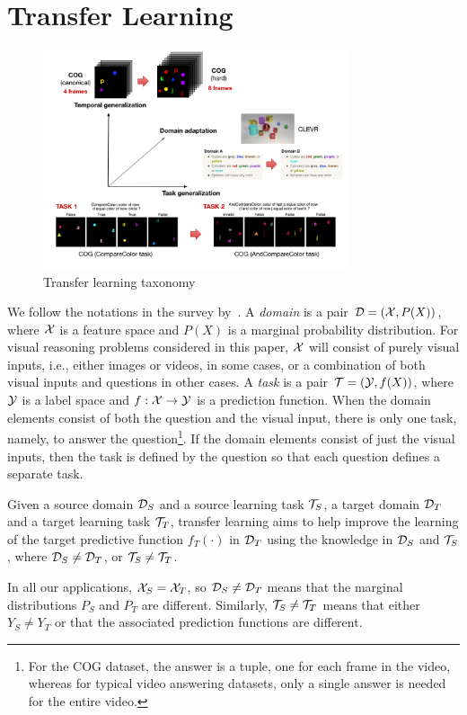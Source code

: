 \section{Transfer Learning}

\begin{figure}
	\caption{Transfer learning taxonomy}
	\label{fig:taskonomy}
	\includegraphics[width=0.8\textwidth]{img/architecture/transfer_taxo}
\end{figure}

We follow the notations in the survey by~\cite{pan-yang}.
A \emph{domain} is a pair $\mathcal{D} = (\mathcal{X},P(X))$, where $\mathcal{X}$ is a feature space and $P(X)$ is a marginal probability distribution.
For visual reasoning problems considered in this paper, 
$\mathcal{X}$ will consist of purely visual inputs, i.e., either images or videos, in some cases, or 
a combination of both visual inputs and questions in other cases. 
A \emph{task} is a pair $\mathcal{T}= (\mathcal{Y},f(X))$, where $\mathcal{Y}$ is a label space and $f: \mathcal{X} \to \mathcal{Y}$ is a prediction function. 
When the domain elements consist of both the question and the visual input, there is only one task, namely, to answer the 
question\footnote{%
	For the COG dataset, the answer is a tuple, one for each frame in the video, whereas for typical video answering datasets,
	only a single answer is needed for the entire video.}. %
If the domain elements consist of just the visual inputs, then the task is defined by the question so that each question 
defines a separate task.
\begin{definition}
	Given a source domain $\mathcal{D}_S$ and a source learning task $\mathcal{T}_S$, a target domain $\mathcal{D}_T$ and a target learning task $\mathcal{T}_T$, transfer learning aims to help improve the 
	learning of the target predictive function $f_T(\cdot)$ in $\mathcal{D}_T$ using the knowledge  in $\mathcal{D}_S$ and $\mathcal{T}_S$, where $\mathcal{D}_S \ne \mathcal{D}_T$, or $\mathcal{T}_S \ne \mathcal{T}_T$.
\end{definition}
In all our applications, $\mathcal{X}_S = \mathcal{X}_T$, so $\mathcal{D}_S \ne \mathcal{D}_T$ means that the marginal distributions $P_S$ and $P_T$ are different.
Similarly, $\mathcal{T}_S \ne \mathcal{T}_T$ means that either $Y_S \ne Y_T$ or that the associated prediction functions are different.

